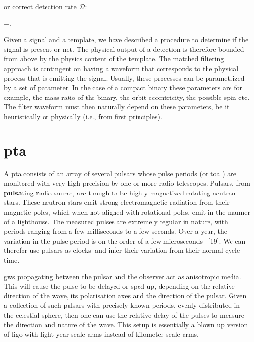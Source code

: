 \documentclass[
  11pt,
  a4paper,
  DIV=11,
  numbers=noendperiod,
  twoside]{scrreprt}
\let\[\relax \let\]\relax %
\DeclareRobustCommand{\[}{\begin{equation}}
\DeclareRobustCommand{\]}{\end{equation}}
\begin{document}
or correct detection rate \(\mathcal{D}\):

\[
=\Half{}.  
\]

Given a signal and a template, we have described a procedure to
determine if the signal is present or not. The physical output of a
detection is therefore bounded from above by the physics content of the
template. The matched filtering approach is contingent on having a
waveform that corresponds to the physical process that is emitting the
signal. Usually, these processes can be parametrized by a set of
parameter. In the case of a compact binary these parameters are for
example, the mass ratio of the binary, the orbit eccentricity, the
possible spin etc. The filter waveform must then naturally depend on
these parameters, be it heuristically or physically (i.e., from first
principles).

\hypertarget{pta}{%
\section{\texorpdfstring{\gls{pta}}{}}\label{pta}}

A \gls{pta} consists of an array of several pulsars whose pulse periods
(or \gls{toa} ) are monitored with very high precision by one or more
radio telescopes. Pulsars, from \textbf{pulsa}ting \textbf{r}adio
source, are though to be highly magnetized rotating neutron stars. These
neutron stars emit strong electromagnetic radiation from their magnetic
poles, which when not aligned with rotational poles, emit in the manner
of a lighthouse. The measured pulses are extremely regular in nature,
with periods ranging from a few milliseconds to a few seconds. Over a
year, the variation in the pulse period is on the order of a few
microseconds ~{[}\protect\hyperlink{ref-Detweiler:1979wn}{19}{]}. We can
therefor use pulsars as clocks, and infer their variation from their
normal cycle time.

\glspl{gw} propagating between the pulsar and the observer act as
anisotropic media. This will cause the pulse to be delayed or sped up,
depending on the relative direction of the wave, its polarisation axes
and the direction of the pulsar. Given a collection of such pulsars with
precisely known periods, evenly distributed in the celestial sphere,
then one can use the relative delay of the pulses to measure the
direction and nature of the wave. This setup is essentially a blown up
version of \gls{ligo} with light-year scale arms instead of kilometer
scale arms.
\end{document}
